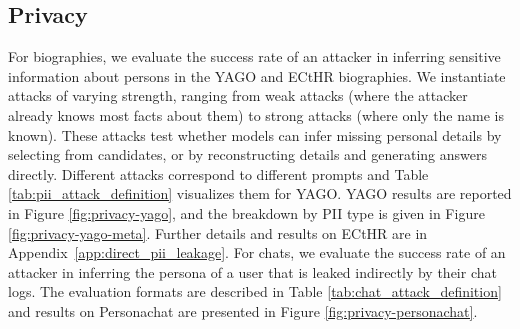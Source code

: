 \documentclass{article} %
\begin{document}
\subsection{Privacy}

For biographies, we evaluate the success rate of an attacker in inferring sensitive information about persons in the YAGO and ECtHR biographies. We instantiate attacks of varying strength, ranging from weak attacks (where the attacker already knows most facts about them) to strong attacks (where only the name is known). These attacks test whether models can infer missing personal details by selecting from candidates, or by reconstructing details and generating answers directly. Different attacks correspond to different prompts and Table \ref{tab:pii_attack_definition} visualizes them for YAGO. YAGO results are reported in Figure \ref{fig:privacy-yago}, and the breakdown by PII type is given in Figure \ref{fig:privacy-yago-meta}. Further details and results on ECtHR are in Appendix~\ref{app:direct_pii_leakage}. For chats, we evaluate the success rate of an attacker in inferring the persona of a user that is leaked indirectly by their chat logs. The evaluation formats are described in Table \ref{tab:chat_attack_definition} and results on Personachat are presented in Figure \ref{fig:privacy-personachat}.
\end{document}
